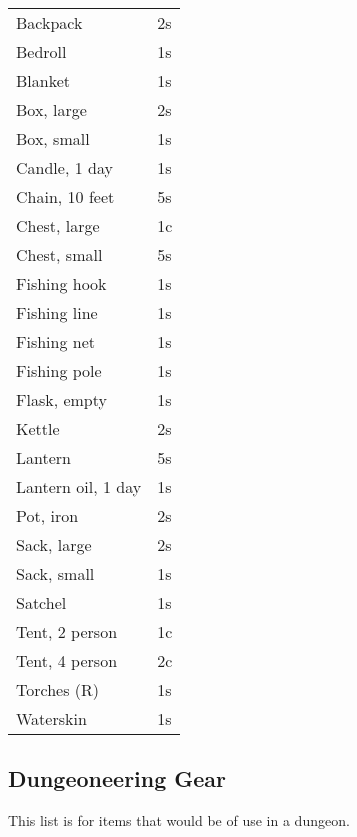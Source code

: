 \begin{center}
{
\begin{xtabular}{|l|l|}
Backpack & 2s \\
Bedroll & 1s \\
Blanket & 1s \\
Box, large & 2s \\
Box, small & 1s \\
Candle, 1 day & 1s \\
Chain, 10 feet & 5s \\
Chest, large & 1c \\
Chest, small & 5s \\
Fishing hook & 1s \\
Fishing line & 1s \\
Fishing net & 1s \\
Fishing pole & 1s \\
Flask, empty & 1s \\
Kettle & 2s \\
Lantern & 5s \\
Lantern oil, 1 day & 1s \\
Pot, iron & 2s \\
Sack, large & 2s \\
Sack, small & 1s \\
Satchel & 1s \\
Tent, 2 person & 1c \\
Tent, 4 person & 2c \\
Torches (R) & 1s \\
Waterskin & 1s \\
\hline
\end{xtabular}
}
\end{center}

\subsection{Dungeoneering Gear}

This list is for items that would be of use in a dungeon.

